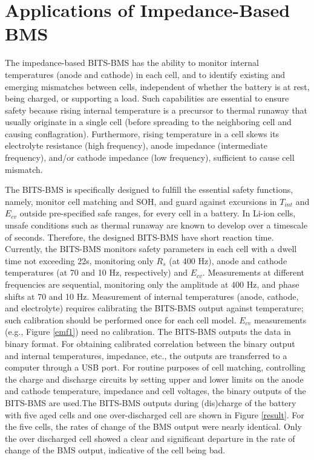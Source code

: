 \section{Applications of Impedance-Based BMS}

\hspace{0.5cm}
The impedance-based BITS-BMS has the ability to monitor internal temperatures (anode and cathode) in each cell, and to identify existing and emerging mismatches between cells, independent of whether the battery is at rest, being charged, or supporting a load. Such capabilities are essential to ensure safety because rising internal temperature is a precursor to thermal runaway that usually originate in a single cell (before spreading to the neighboring cell and causing conflagration). Furthermore, rising temperature in a cell skews its electrolyte resistance (high frequency), anode impedance (intermediate frequency), and/or cathode impedance (low frequency), sufficient to cause cell mismatch. 

\vspace{0.5cm}
The BITS-BMS is specifically designed to fulfill the essential safety functions, namely, monitor cell matching and SOH, and guard against excursions in $T_{int}$ and $E_{cv}$ outside pre-specified safe ranges, for every cell in a battery. In Li-ion cells, unsafe conditions such as thermal runaway are known to develop over a timescale of seconds. Therefore, the designed BITS-BMS have short reaction time. Currently, the BITS-BMS monitors safety parameters in each cell with a dwell time not exceeding 22s, monitoring only $R_s$ (at 400 Hz), anode and cathode temperatures (at 70 and 10 Hz, respectively) and $E_{cv}$. Measurements at different frequencies are sequential, monitoring only the amplitude at 400 Hz, and phase shifts at 70 and 10 Hz. Measurement of internal temperatures (anode, cathode, and electrolyte) requires calibrating the BITS-BMS output against temperature; such calibration should be performed once for each cell model. $E_{cv}$ measurements (e.g., Figure \ref{emf1}) need no calibration. The BITS-BMS outputs the data in binary format. For obtaining calibrated correlation between the binary output and internal temperatures, impedance, etc., the outputs are transferred to a computer through a USB port. For routine purposes of cell matching, controlling the charge and discharge circuits by setting upper and lower limits on the anode and cathode temperature, impedance and cell voltages, the binary outputs of the BITS-BMS are used.The BITS-BMS outputs during (dis)charge of the battery with five aged cells and one over-discharged cell are shown in Figure \ref{result}. For the five cells, the rates of change of the BMS output were nearly identical. Only the over discharged cell showed a clear and significant departure in the rate of change of the BMS output, indicative of the cell being bad.

